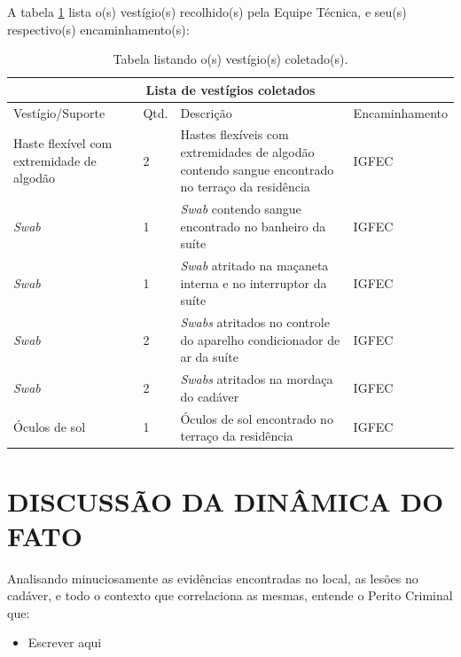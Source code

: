 \documentclass[a4paper,12pt,oneside]{article}
\newcounter{c}
\newcounter{d}
\newcounter{u}
\begin{document}

A tabela \ref{encaminhamentos} lista o(s) vestígio(s) recolhido(s) pela Equipe Técnica, e seu(s) respectivo(s) encaminhamento(s):


\vspace{18pt}
\begin{table}[H]
	\centering
	\begin{tabular}{ |p{4cm}|p{0.8cm}|p{6cm}|p{3cm}|  }
		\hline
		\multicolumn{4}{|c|}{\textbf{Lista de vestígios coletados}} \\
		\hline
		Vestígio/Suporte & Qtd. & Descrição & Encaminhamento\\
		\hline
		\hline
		Haste flexível com extremidade de algodão & 2 & Hastes flexíveis com extremidades de algodão contendo sangue encontrado no terraço da residência & IGFEC\\
		\hline
		{\sl Swab} & 1 & {\sl Swab} contendo sangue encontrado no banheiro da suíte & IGFEC\\
		\hline
		{\sl Swab} & 1 & {\sl Swab} atritado na maçaneta interna e no interruptor da suíte & IGFEC\\
		\hline
		{\sl Swab} & 2 & {\sl Swabs} atritados no controle do aparelho condicionador de ar da suíte & IGFEC\\
		\hline
		{\sl Swab} & 2 & {\sl Swabs} atritados na mordaça do cadáver & IGFEC\\
		\hline
		Óculos de sol & 1 & Óculos de sol encontrado no terraço da residência & IGFEC\\
		\hline
		\hline
	\end{tabular}
	\caption{Tabela listando o(s) vestígio(s) coletado(s).}
	\label{encaminhamentos}
\end{table}



\section{DISCUSSÃO DA DINÂMICA DO FATO \label{dinamica}}

Analisando minuciosamente as evidências encontradas no local, as lesões no cadáver, e todo o contexto que correlaciona as mesmas, entende o Perito Criminal que:

\begin{itemize}
	\item Escrever aqui

\end{itemize}
\end{document}
